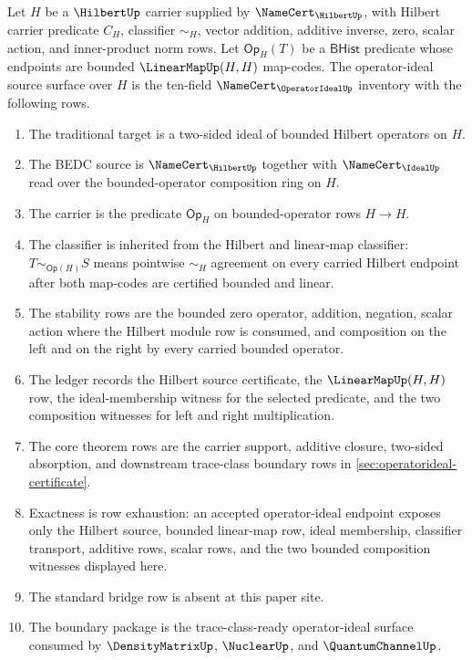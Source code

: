 \begin{definition}
\label{def:operatorideal-hilbert-source-surface}
Let $H$ be a $\HilbertUp$ carrier supplied by $\NameCert_{\HilbertUp}$, with Hilbert carrier predicate $C_H$, classifier $\sim_H$, vector addition, additive inverse, zero, scalar action, and inner-product norm rows. Let $\mathsf{Op}_H(T)$ be a $\mathsf{BHist}$ predicate whose endpoints are bounded $\LinearMapUp(H,H)$ map-codes. The operator-ideal source surface over $H$ is the ten-field $\NameCert_{\OperatorIdealUp}$ inventory with the following rows.
\begin{enumerate}
\item The traditional target is a two-sided ideal of bounded Hilbert operators on $H$.
\item The BEDC source is $\NameCert_{\HilbertUp}$ together with $\NameCert_{\IdealUp}$ read over the bounded-operator composition ring on $H$.
\item The carrier is the predicate $\mathsf{Op}_H$ on bounded-operator rows $H\to H$.
\item The classifier is inherited from the Hilbert and linear-map classifier: $T\sim_{\mathsf{Op}(H)}S$ means pointwise $\sim_H$ agreement on every carried Hilbert endpoint after both map-codes are certified bounded and linear.
\item The stability rows are the bounded zero operator, addition, negation, scalar action where the Hilbert module row is consumed, and composition on the left and on the right by every carried bounded operator.
\item The ledger records the Hilbert source certificate, the $\LinearMapUp(H,H)$ row, the ideal-membership witness for the selected predicate, and the two composition witnesses for left and right multiplication.
\item The core theorem rows are the carrier support, additive closure, two-sided absorption, and downstream trace-class boundary rows in \autoref{sec:operatorideal-certificate}.
\item Exactness is row exhaustion: an accepted operator-ideal endpoint exposes only the Hilbert source, bounded linear-map row, ideal membership, classifier transport, additive rows, scalar rows, and the two bounded composition witnesses displayed here.
\item The standard bridge row is absent at this paper site.
\item The boundary package is the trace-class-ready operator-ideal surface consumed by $\DensityMatrixUp$, $\NuclearUp$, and $\QuantumChannelUp$.
\end{enumerate}
\end{definition}


